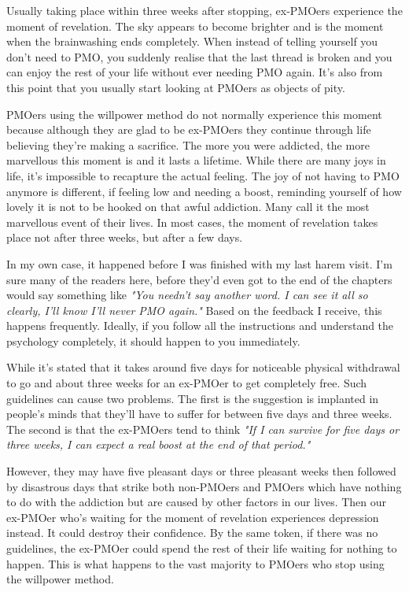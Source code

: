 \documentclass[easypeasy.tex]{subfiles}
\begin{document}
Usually taking place within three weeks after stopping, ex-PMOers experience the moment of revelation. The sky appears to become brighter and is the moment when the brainwashing ends completely. When instead of telling yourself you don't need to PMO, you suddenly realise that the last thread is broken and you can enjoy the rest of your life without ever needing PMO again. It's also from this point that you usually start looking at PMOers as objects of pity.

PMOers using the willpower method do not normally experience this moment because although they are glad to be ex-PMOers they continue through life believing they're making a sacrifice. The more you were addicted, the more marvellous this moment is and it lasts a lifetime. While there are many joys in life, it's impossible to recapture the actual feeling. The joy of not having to PMO anymore is different, if feeling low and needing a boost, reminding yourself of how lovely it is not to be hooked on that awful addiction. Many call it the most marvellous event of their lives. In most cases, the moment of revelation takes place not after three weeks, but after a few days. 

In my own case, it happened before I was finished with my last harem visit. I'm sure many of the readers here, before they'd even got to the end of the chapters would say something like \textit{"You needn't say another word. I can see it all so clearly, I'll know I'll never PMO again."} Based on the feedback I receive, this happens frequently. Ideally, if you follow all the instructions and understand the psychology completely, it should happen to you immediately.

While it's stated that it takes around five days for noticeable physical withdrawal to go and about three weeks for an ex-PMOer to get completely free. Such guidelines can cause two problems. The first is the suggestion is implanted in people's minds that they'll have to suffer for between five days and three weeks. The second is that the ex-PMOers tend to think \textit{"If I can survive for five days or three weeks, I can expect a real boost at the end of that period."}

However, they may have five pleasant days or three pleasant weeks then followed by disastrous days that strike both non-PMOers and PMOers which have nothing to do with the addiction but are caused by other factors in our lives. Then our ex-PMOer who's waiting for the moment of revelation experiences depression instead. It could destroy their confidence. By the same token, if there was no guidelines, the ex-PMOer could spend the rest of their life waiting for nothing to happen. This is what happens to the vast majority to PMOers who stop using the willpower method.
\end{document}
